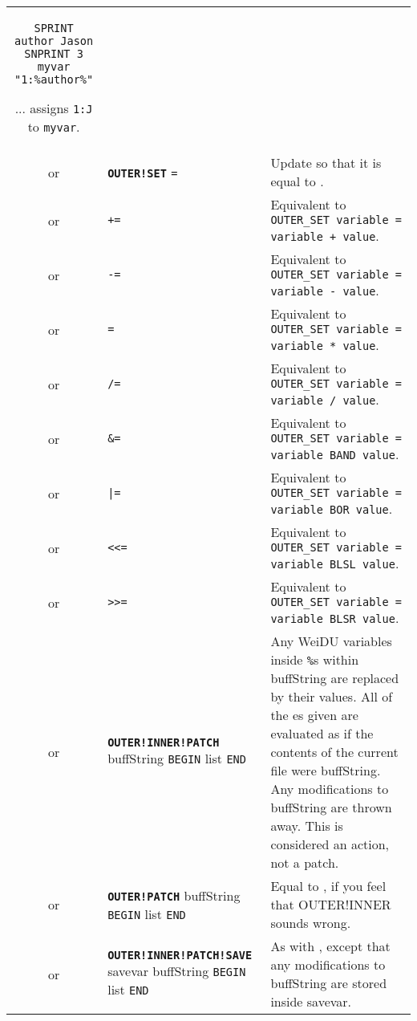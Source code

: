 \documentclass{article}
\def\ttref#1{\ahrefloc{#1}{\tt #1}}
\def\DEFINE#1{{\tt \bf #1}\label{#1}\index{#1}}
\def\t#1{{\tt #1}}
\def\Slist{{\color{red} list }}
\begin{document}
\begin{tabular}{cp{10in}|p{10in}}
\begin{verbatim}
SPRINT author Jason
SNPRINT 3 myvar "1:%author%"
\end{verbatim}
  ... assigns \t{1:J} to \t{myvar}.  \\
or & \DEFINE{OUTER!SET} \ttref{variable} \t{=} \ttref{value} &
  Update \ttref{variable} so that it is equal to \ttref{value}. \\
or & \ttref{OUTER!SET} \ttref{variable} \t{+=} \ttref{value} &
  Equivalent to \t{OUTER_SET variable = variable + value}. \\
or & \ttref{OUTER!SET} \ttref{variable} \t{-=} \ttref{value} &
  Equivalent to \t{OUTER_SET variable = variable - value}. \\
or & \ttref{OUTER!SET} \ttref{variable} \t{*=} \ttref{value} &
  Equivalent to \t{OUTER_SET variable = variable * value}. \\
or & \ttref{OUTER!SET} \ttref{variable} \t{/=} \ttref{value} &
  Equivalent to \t{OUTER_SET variable = variable / value}. \\
or & \ttref{OUTER!SET} \ttref{variable} \t{\&=} \ttref{value} &
  Equivalent to \t{OUTER_SET variable = variable BAND value}. \\
or & \ttref{OUTER!SET} \ttref{variable} \t{|=} \ttref{value} &
  Equivalent to \t{OUTER_SET variable = variable BOR value}. \\
or & \ttref{OUTER!SET} \ttref{variable} \t{<<=} \ttref{value} &
  Equivalent to \t{OUTER_SET variable = variable BLSL value}. \\
or & \ttref{OUTER!SET} \ttref{variable} \t{>>=} \ttref{value} &
  Equivalent to \t{OUTER_SET variable = variable BLSR value}. \\
or & \DEFINE{OUTER!INNER!PATCH} buffString \t{BEGIN} \ttref{patch} \Slist \t{END} &
  Any WeiDU variables inside \t{\%}s within buffString are replaced by
  their values. All of the \ttref{patch}es given are evaluated as if the
  contents of the current file were buffString. Any modifications to
  buffString are thrown away. This is considered an action, not a patch. \\
or & \DEFINE{OUTER!PATCH} buffString \t{BEGIN} \ttref{patch} \Slist \t{END} &
  Equal to \ttref{OUTER!INNER!PATCH}, if you feel that OUTER!INNER sounds wrong. \\
or & \DEFINE{OUTER!INNER!PATCH!SAVE} savevar buffString \t{BEGIN} \ttref{patch} \Slist \t{END} &
  As with \ttref{OUTER!INNER!PATCH}, except that any modifications to buffString are stored inside
  savevar. \\

\end{tabular}
\end{document}
